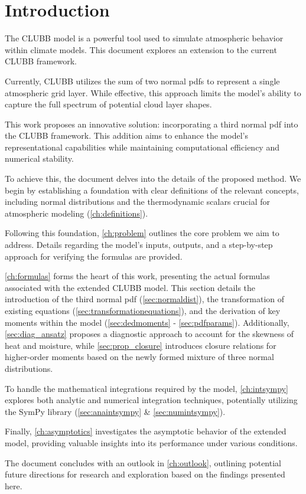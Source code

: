 \chapter{Introduction}\label{ch:introduction}

The \gls{CLUBB} model is a powerful tool used to simulate atmospheric behavior within climate models.
This document explores an extension to the current \gls{CLUBB} framework.

Currently, \gls{CLUBB} utilizes the sum of two normal \glspl{pdf} to represent a single atmospheric grid layer.
While effective, this approach limits the model's ability to capture the full spectrum of potential cloud layer shapes.

This work proposes an innovative solution: incorporating a third normal \gls{pdf} into the \gls{CLUBB} framework.
This addition aims to enhance the model's representational capabilities while maintaining computational efficiency and numerical stability.

To achieve this, the document delves into the details of the proposed method.
We begin by establishing a foundation with clear definitions of the relevant concepts, including normal distributions and the thermodynamic scalars crucial for atmospheric modeling (\autoref{ch:definitions}).

Following this foundation, \autoref{ch:problem} outlines the core problem we aim to address.
Details regarding the model's inputs, outputs, and a step-by-step approach for verifying the formulas are provided.

\autoref{ch:formulas} forms the heart of this work, presenting the actual formulas associated with the extended CLUBB model.
This section details the introduction of the third normal \gls{pdf} (\autoref{sec:normaldist}), the transformation of existing equations (\autoref{sec:transformationequations}), and the derivation of key moments within the model (\autoref{sec:dedmoments} - \autoref{sec:pdfparams}).
Additionally, \autoref{sec:diag_ansatz} proposes a diagnostic approach to account for the skewness of heat and moisture, while \autoref{sec:prop_closure} introduces closure relations for higher-order moments based on the newly formed mixture of three normal distributions.

To handle the mathematical integrations required by the model, \autoref{ch:intsympy} explores both analytic and numerical integration techniques, potentially utilizing the SymPy library (\autoref{sec:anaintsympy} \& \autoref{sec:numintsympy}).

Finally, \autoref{ch:asymptotics} investigates the asymptotic behavior of the extended model, providing valuable insights into its performance under various conditions.

The document concludes with an outlook in \autoref{ch:outlook}, outlining potential future directions for research and exploration based on the findings presented here.
